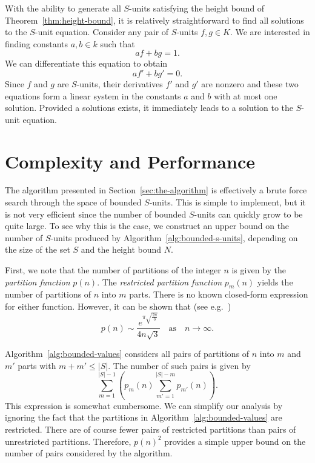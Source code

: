 With the ability to generate all \(S\)-units satisfying the height bound of Theorem~\ref{thm:height-bound}, it is relatively straightforward to find all solutions to the \(S\)-unit equation. Consider any pair of \(S\)-units \(f, g \in K\). We are interested in finding constants \(a, b \in k\) such that
\[af + bg = 1.\]
We can differentiate this equation to obtain
\[af' + bg' = 0.\]
Since \(f\) and \(g\) are \(S\)-units, their derivatives \(f'\) and \(g'\) are nonzero and these two equations form a linear system in the constants \(a\) and \(b\) with at most one solution. Provided a solutions exists, it immediately leads to a solution to the \(S\)-unit equation.

\section{Complexity and Performance}%
\label{sec:complexity-and-performance}

The algorithm presented in Section~\ref{sec:the-algorithm} is effectively a brute force search through the space of bounded \(S\)-units. This is simple to implement, but it is not very efficient since the number of bounded \(S\)-units can quickly grow to be quite large. To see why this is the case, we construct an upper bound on the number of \(S\)-units produced by Algorithm~\ref{alg:bounded-s-units}, depending on the size of the set \(S\) and the height bound \(N\).

First, we note that the number of partitions of the integer \(n\) is given by the \textit{partition function} \(p(n)\). The \textit{restricted partition function} \(p_{m}(n)\) yields the number of partitions of \(n\) into \(m\) parts. There is no known closed-form expression for either function. However, it can be shown that (see e.g.~\cite[Theorem 6.3]{andrews-1984-the-theory-of})
\[p(n) \sim \frac{e^{\pi\sqrt{\frac{2n}{3}}}}{4n\sqrt{3}} \quad \text{as} \quad n \to \infty.\]

Algorithm~\ref{alg:bounded-values} considers all pairs of partitions  of \(n\) into \(m\) and \(m'\) parts with \(m + m' \leq |S|\). The number of such pairs is given by
\[\sum_{m = 1}^{|S| - 1} \left( p_{m}(n) \sum_{m' = 1}^{|S| - m} p_{m'}(n) \right).\]
This expression is somewhat cumbersome. We can simplify our analysis by ignoring the fact that the partitions in Algorithm~\ref{alg:bounded-values} are restricted. There are of course fewer pairs of restricted partitions than pairs of unrestricted partitions. Therefore, \({p(n)}^{2}\) provides a simple upper bound on the number of pairs considered by the algorithm.


